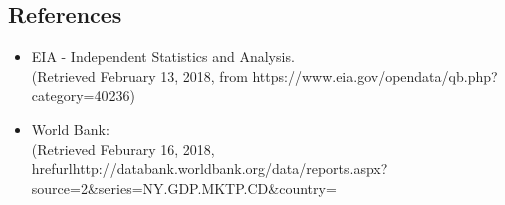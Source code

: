 \documentclass[14pt, titlepage]{article}
\begin{document}
		\subsection*{References}
		
			\begin{itemize}
								 	
		 		\item EIA - Independent Statistics and Analysis. \\ (Retrieved February 13, 2018, from https://www.eia.gov/opendata/qb.php?category=40236)
		 
		 		\item World Bank: \\ (Retrieved Feburary 16, 2018, \\ href{url}{http://databank.worldbank.org/data/reports.aspx?source=2\&series=NY.GDP.MKTP.CD\&country=}

			\end{itemize}
\end{document}
